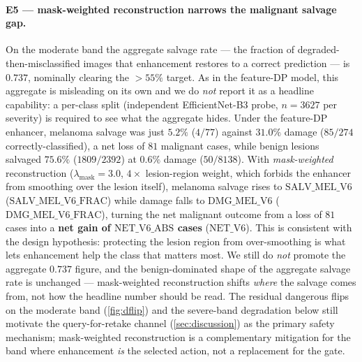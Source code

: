 \paragraph{E5 --- mask-weighted reconstruction narrows the malignant salvage gap.}
On the moderate band the aggregate salvage rate --- the fraction of degraded-then-misclassified
images that enhancement restores to a correct prediction --- is $0.737$, nominally clearing the
$>55\%$ target. As in the feature-DP model, this aggregate is misleading on its own and we do
\emph{not} report it as a headline capability: a per-class split (independent EfficientNet-B3
probe, $n=3627$ per severity) is required to see what the aggregate hides. Under the
feature-DP enhancer, melanoma salvage was just $5.2\%$ ($4/77$) against $31.0\%$ damage
($85/274$ correctly-classified), a net loss of $81$ malignant cases, while benign lesions
salvaged $75.6\%$ ($1809/2392$) at $0.6\%$ damage ($50/8138$). With \emph{mask-weighted}
reconstruction ($\lambda_{\text{mask}}=3.0$, $4\times$ lesion-region weight, which forbids the
enhancer from smoothing over the lesion itself), melanoma salvage rises to
$\mathrm{SALV\_MEL\_V6}$ ($\mathrm{SALV\_MEL\_V6\_FRAC}$) while damage falls to
$\mathrm{DMG\_MEL\_V6}$ ($\mathrm{DMG\_MEL\_V6\_FRAC}$), turning the net malignant outcome from a
loss of $81$ cases into a \textbf{net gain of $\mathrm{NET\_V6\_ABS}$ cases}
($\mathrm{NET\_V6}$). This is consistent with the design hypothesis: protecting the lesion
region from over-smoothing is what lets enhancement help the class that matters most. We still
do \emph{not} promote the aggregate $0.737$ figure, and the benign-dominated shape of the
aggregate salvage rate is unchanged --- mask-weighted reconstruction shifts \emph{where} the
salvage comes from, not how the headline number should be read. The residual dangerous flips on
the moderate band (\cref{fig:dflip}) and the severe-band degradation below still motivate the
query-for-retake channel (\cref{sec:discussion}) as the primary safety mechanism; mask-weighted
reconstruction is a complementary mitigation for the band where enhancement \emph{is} the
selected action, not a replacement for the gate.


